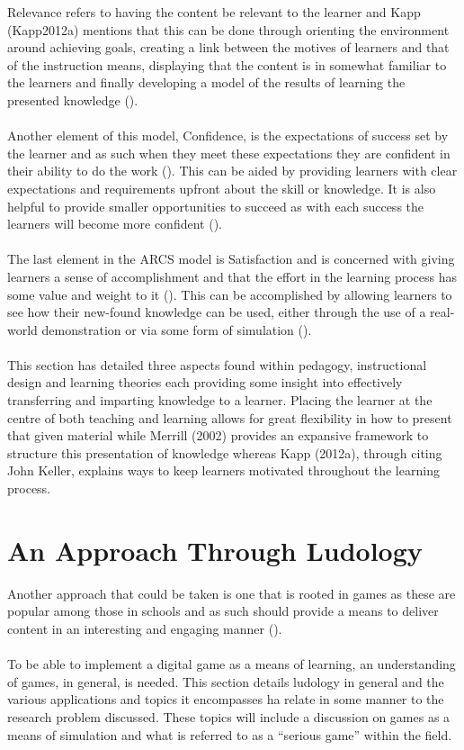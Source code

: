 Relevance refers to having the content be relevant to the learner and Kapp (Kapp2012a) mentions that this can be done through orienting the environment around achieving goals, creating a link between the motives of learners and that of the instruction means, displaying that the content is in somewhat familiar to the learners and finally developing a model of the results of learning the presented knowledge (\cite{keller1987development}).
\\\\
Another element of this model, Confidence, is the expectations of success set by the learner and as such when they meet these expectations they are confident in their ability to do the work (\cite{Kapp2012a, keller1987development}). This can be aided by providing learners with clear expectations and requirements upfront about the skill or knowledge. It is also helpful to provide smaller opportunities to succeed as with each success the learners will become more confident (\cite{Kapp2012a, keller1987development}).
\\\\
The last element in the ARCS model is Satisfaction and is concerned with giving learners a sense of accomplishment and that the effort in the learning process has some value and weight to it (\cite{Kapp2012a, keller1987development}). This can be accomplished by allowing learners to see how their new-found knowledge can be used, either through the use of a real-world demonstration or via some form of simulation (\cite{Kapp2012a, keller1987development}).
\\\\
This section has detailed three aspects found within pedagogy, instructional design and learning theories each providing some insight into effectively transferring and imparting knowledge to a learner. Placing the learner at the centre of both teaching and learning allows for great flexibility in how to present that given material while Merrill (2002) provides an expansive framework to structure this presentation of knowledge whereas Kapp (2012a), through citing John Keller, explains ways to keep learners motivated throughout the learning process.

\newpage
\section{An Approach Through Ludology}
Another approach that could be taken is one that is rooted in games as these are popular among those in schools and as such should provide a means to deliver content in an interesting and engaging manner (\cite{Virvou2005}).
\\\\
To be able to implement a digital game as a means of learning, an understanding of games, in general, is needed. This section details ludology in general and the various applications and topics it encompasses ha relate in some manner to the research problem discussed. These topics will include a discussion on games as a means of simulation and what is referred to as a “serious game” within the field. 

